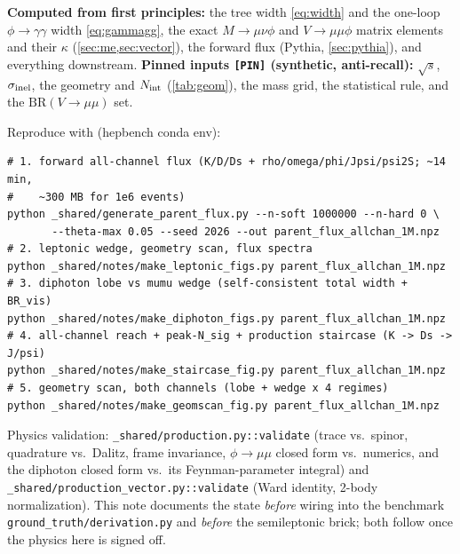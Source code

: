 \documentclass[11pt]{article}
\begin{document}
\textbf{Computed from first principles:} the tree width \cref{eq:width} and the
one-loop $\phi\to\gamma\gamma$ width \cref{eq:gammagg}, the exact $M\to\mu\nu\phi$
and $V\to\mu\mu\phi$ matrix elements and their $\kappa$
(\cref{sec:me,sec:vector}), the forward flux (Pythia, \cref{sec:pythia}), and
everything downstream. \textbf{Pinned inputs \texttt{[PIN]} (synthetic,
anti-recall):} $\sqrt{s}$, $\sigma_{\rm inel}$, the geometry and $N_{\rm int}$
(\cref{tab:geom}), the mass grid, the statistical rule, and the
$\mathrm{BR}(V\to\mu\mu)$ set.

Reproduce with (hepbench conda env):
\begin{lstlisting}
# 1. forward all-channel flux (K/D/Ds + rho/omega/phi/Jpsi/psi2S; ~14 min,
#    ~300 MB for 1e6 events)
python _shared/generate_parent_flux.py --n-soft 1000000 --n-hard 0 \
       --theta-max 0.05 --seed 2026 --out parent_flux_allchan_1M.npz
# 2. leptonic wedge, geometry scan, flux spectra
python _shared/notes/make_leptonic_figs.py parent_flux_allchan_1M.npz
# 3. diphoton lobe vs mumu wedge (self-consistent total width + BR_vis)
python _shared/notes/make_diphoton_figs.py parent_flux_allchan_1M.npz
# 4. all-channel reach + peak-N_sig + production staircase (K -> Ds -> J/psi)
python _shared/notes/make_staircase_fig.py parent_flux_allchan_1M.npz
# 5. geometry scan, both channels (lobe + wedge x 4 regimes)
python _shared/notes/make_geomscan_fig.py parent_flux_allchan_1M.npz
\end{lstlisting}
Physics validation: \texttt{\_shared/production.py::validate} (trace vs.\ spinor,
quadrature vs.\ Dalitz, frame invariance, $\phi\to\mu\mu$ closed form vs.\
numerics, and the diphoton closed form vs.\ its Feynman-parameter integral) and
\texttt{\_shared/production\_vector.py::validate} (Ward identity, 2-body
normalization). This note documents the state \emph{before} wiring into the
benchmark \texttt{ground\_truth/derivation.py} and \emph{before} the semileptonic
brick; both follow once the physics here is signed off.
\end{document}
